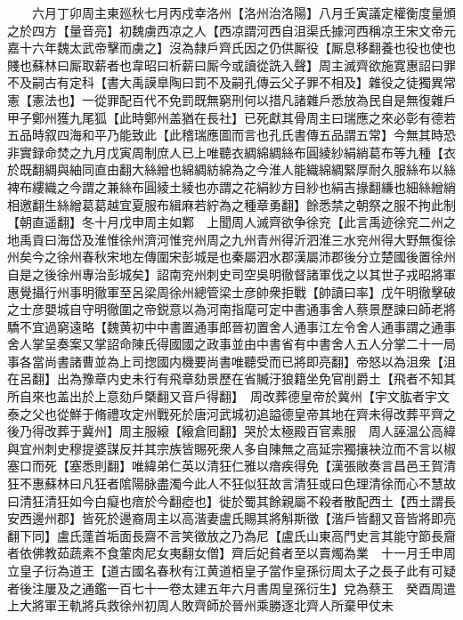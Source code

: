 　　六月丁卯周主東廵秋七月丙戍幸洛州【洛州治洛陽】八月壬寅議定權衡度量頒之於四方【量音亮】初魏虜西凉之人【西凉謂河西自沮渠氏據河西稱凉王宋文帝元嘉十六年魏太武帝擊而虜之】沒為隸戶齊氏因之仍供厮役【厮息移翻養也役也使也賤也蘇林曰厮取薪者也韋昭曰析薪曰厮今或讀從詵入聲】周主滅齊欲施寛惠詔曰罪不及嗣古有定科【書大禹謨臯陶曰罰不及嗣孔傳云父子罪不相及】雜役之徒獨異常憲【憲法也】一從罪配百代不免罰既無窮刑何以措凡諸雜戶悉放為民自是無復雜戶甲子鄭州獲九尾狐【此時鄭州盖猶在長社】已死獻其骨周主曰瑞應之來必彰有德若五品時叙四海和平乃能致此【此稽瑞應圖而言也孔氏書傳五品謂五常】今無其時恐非實録命焚之九月戊寅周制庶人已上唯聽衣綢綿綢絲布圓綾紗絹綃葛布等九種【衣於既翻綢與紬同直由翻大絲繒也綿綢紡綿為之今淮人能織綿綢緊厚耐久服絲布以絲裨布縷織之今謂之兼絲布圓綾土綾也亦謂之花絹紗方目紗也絹吉掾翻縑也細絲繒綃相邀翻生絲繒葛葛越宜夏服布緝麻若紵為之種章勇翻】餘悉禁之朝祭之服不拘此制【朝直遥翻】冬十月戊申周主如鄴　上聞周人滅齊欲争徐兖【此言禹迹徐兖二州之地禹貢曰海岱及淮惟徐州濟河惟兖州周之九州青州得沂泗淮三水兖州得大野無復徐州矣今之徐州春秋宋地左傳圍宋彭城是也秦屬泗水郡漢屬沛郡後分立楚國後置徐州自是之後徐州專治彭城矣】詔南兖州刺史司空吳明徹督諸軍伐之以其世子戎昭將軍惠覺攝行州事明徹軍至呂梁周徐州總管梁士彦帥衆拒戰【帥讀曰率】戊午明徹擊破之士彦嬰城自守明徹圍之帝鋭意以為河南指麾可定中書通事舍人蔡景歷諫曰師老將驕不宜過窮遠略【魏黄初中中書置通事郎晉初置舍人通事江左令舍人通事謂之通事舍人掌呈奏案又掌詔命陳氏得國國之政事並由中書省有中書舍人五人分掌二十一局事各當尚書諸曹並為上司揔國内機要尚書唯聽受而已將即亮翻】帝怒以為沮衆【沮在呂翻】出為豫章内史未行有飛章劾景歷在省贓汙狼籍坐免官削爵土【飛者不知其所自來也盖出於上意劾戶槩翻又音戶得翻】　周改葬德皇帝於冀州【宇文肱者宇文泰之父也從鮮于脩禮攻定州戰死於唐河武城初追謚德皇帝其地在齊未得改葬平齊之後乃得改葬于冀州】周主服縗【縗倉囘翻】哭於太極殿百官素服　周人誣温公高緯與宜州刺史穆提婆謀反并其宗族皆賜死衆人多自陳無之高延宗獨攘袂泣而不言以椒塞口而死【塞悉則翻】唯緯弟仁英以清狂仁雅以瘖疾得免【漢張敞奏言昌邑王賀清狂不惠蘇林曰凡狂者隂陽脉盡濁今此人不狂似狂故言清狂或曰色理清徐而心不慧故曰清狂清狂如今白癡也瘖於今翻瘂也】徙於蜀其餘親屬不殺者散配西土【西土謂長安西邊州郡】皆死於邊裔周主以高湝妻盧氏賜其將斛斯徵【湝戶皆翻又音皆將即亮翻下同】盧氏蓬首垢面長齋不言笑徵放之乃為尼【盧氏山東高門史言其能守節長齎者依佛教茹蔬素不食葷肉尼女夷翻女僧】齊后妃貧者至以賣燭為業　十一月壬申周立皇子衍為道王【道古國名春秋有江黄道栢皇子當作皇孫衍周太子之長子此有可疑者後注屢及之通鑑一百七十一卷太建五年六月書周皇孫衍生】兌為蔡王　癸酉周遣上大將軍王軌將兵救徐州初周人敗齊師於晉州乘勝逐北齊人所棄甲仗未

